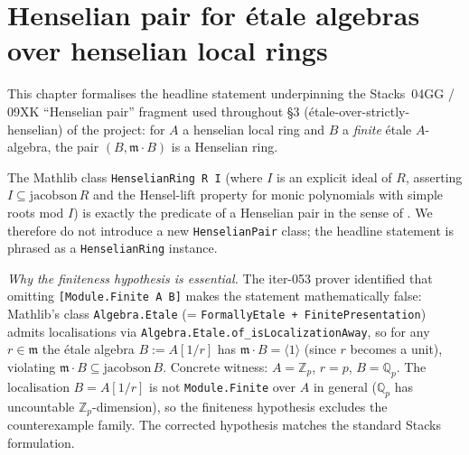 \chapter{Henselian pair for étale algebras over henselian local rings}
\label{chap:Mathlib_RingTheory_Etale_HenselianPair}

This chapter formalises the headline statement underpinning the
Stacks~04GG / 09XK ``Henselian pair'' fragment used throughout
\S3 (étale-over-strictly-henselian) of the project: for $A$ a
henselian local ring and $B$ a \emph{finite} étale $A$-algebra,
the pair $(B, \mathfrak m \cdot B)$ is a Henselian ring.

The Mathlib class \texttt{HenselianRing R I} (where $I$ is an
explicit ideal of $R$, asserting $I \subseteq \mathrm{jacobson}\,R$
and the Hensel-lift property for monic polynomials with simple
roots mod $I$) is exactly the predicate of a Henselian pair in
the sense of \cite[Tag~09XD]{stacks}. We therefore do not introduce
a new \texttt{HenselianPair} class; the headline statement is
phrased as a \texttt{HenselianRing} instance.

\emph{Why the finiteness hypothesis is essential.} The iter-053
prover identified that omitting \texttt{[Module.Finite A B]}
makes the statement mathematically false: Mathlib's class
\texttt{Algebra.Etale} (= \texttt{FormallyEtale + FinitePresentation})
admits localisations via
\texttt{Algebra.Etale.of\_isLocalizationAway}, so for any
$r \in \mathfrak m$ the étale algebra $B := A[1/r]$ has
$\mathfrak m \cdot B = \langle 1 \rangle$ (since $r$ becomes a
unit), violating $\mathfrak m \cdot B \subseteq
\mathrm{jacobson}\,B$. Concrete witness:
$A = \mathbb{Z}_p$, $r = p$, $B = \mathbb{Q}_p$. The localisation
$B = A[1/r]$ is not \texttt{Module.Finite} over $A$ in general
($\mathbb{Q}_p$ has uncountable $\mathbb{Z}_p$-dimension), so the
finiteness hypothesis excludes the counterexample family. The
corrected hypothesis matches the standard Stacks formulation.

